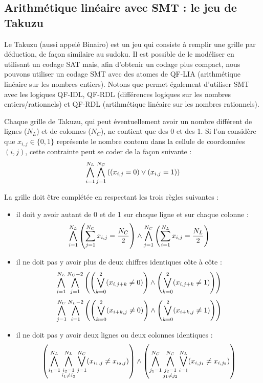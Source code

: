 \subsection{Arithmétique linéaire avec SMT : le jeu de Takuzu}\label{chap:touist:touist:smt}

Le Takuzu (aussi appelé Binairo) est un jeu qui consiste à remplir une grille par déduction, de façon similaire au sudoku.
Il est possible de le modéliser en utilisant un codage SAT mais, afin d'obtenir un codage plus compact, nous pouvons utiliser un codage SMT avec des atomes de QF-LIA (arithmétique linéaire sur les nombres entiers). Notons que \touist permet également d'utiliser SMT avec les logiques QF-IDL, QF-RDL (différences logiques sur les nombres entiers/rationnels) et QF-RDL (artihmétique linéaire sur les nombres rationnels). %


Chaque grille de Takuzu, qui peut éventuellement avoir un nombre différent de lignes ($N_L$) et de colonnes ($N_C$), ne contient que des 0 et des 1.
Si l'on considère que $x_{i,j}\in\{0,1\}$ représente le nombre contenu dans la cellule de coordonnées $(i,j)$, cette contrainte peut se coder de la façon suivante :
\[
\bigwedge\limits_{\substack{i=1}}^{N_L} \bigwedge\limits_{\substack{j=1}}^{N_C} \left( (x_{i,j}=0) \lor (x_{i,j}=1) \right)
\]

\noindent La grille doit être complétée en respectant les trois règles suivantes :

\begin{itemize}
\item il doit y avoir autant de 0 et de 1 sur chaque ligne et sur chaque colonne :
\[
\bigwedge\limits_{\substack{i=1}}^{N_L} \left( \sum\limits_{j=1}^{N_C} x_{i,j} = \frac{N_C}{2} \right)
\land \bigwedge\limits_{\substack{j=1}}^{N_C} \left( \sum\limits_{i=1}^{N_L} x_{i,j} = \frac{N_L}{2} \right)
\]
\item il ne doit pas y avoir plus de deux chiffres identiques côte à côte :
\[
\bigwedge\limits_{\substack{i=1}}^{N_L} \bigwedge\limits_{\substack{j=1}}^{N_C-2} \left( \left( \bigvee\limits_{\substack{k=0}}^{2} (x_{i,j+k}\neq 0)\right) \land \left( \bigvee\limits_{\substack{k=0}}^{2} (x_{i,j+k}\neq 1)\right) \right)
\]
\[
\bigwedge\limits_{\substack{j=1}}^{N_C} \bigwedge\limits_{\substack{i=1}}^{N_L-2} \left( \left( \bigvee\limits_{\substack{k=0}}^{2} (x_{i+k,j}\neq 0)\right) \land \left( \bigvee\limits_{\substack{k=0}}^{2} (x_{i+k,j}\neq 1)\right) \right)
\]
\item il ne doit pas y avoir deux lignes ou deux colonnes identiques :
\[
\left( \bigwedge\limits_{\substack{i_1=1}}^{N_L} \bigwedge\limits_{\substack{\substack{i_2=1\\i_1\neq i_2}}}^{N_L} \bigvee\limits_{\substack{j=1}}^{N_C} (x_{i_1,j}\neq x_{i_2,j}) \right)
\land \left( \bigwedge\limits_{\substack{j_1=1}}^{N_C} \bigwedge\limits_{\substack{\substack{j_2=1\\j_1\neq j_2}}}^{N_C} \bigvee\limits_{\substack{i=1}}^{N_L} (x_{i,j_1}\neq x_{i,j_2}) \right)
\]
\end{itemize}

